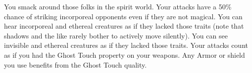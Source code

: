{You smack around those folks in the spirit world.}
{Your attacks have a 50\% chance of striking incorporeal opponents even if they are not magical.}
{You can hear incorporeal and ethereal creatures as if they lacked those traits (note that shadows and the like rarely bother to actively move silently).}
{You can see invisible and ethereal creatures as if they lacked those traits.}
{Your attacks count as if you had the Ghost Touch property on your weapons.}
{Any Armor or shield you use benefits from the Ghost Touch quality.}